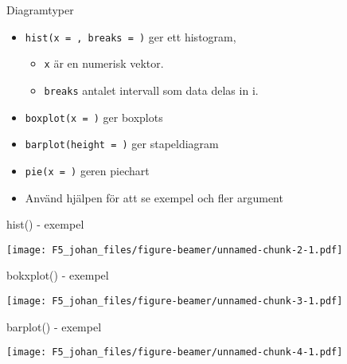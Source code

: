 \documentclass[
  11pt,
  ignorenonframetext,
  handout]{beamer}
\newenvironment{Shaded}{\begin{snugshade}}{\end{snugshade}}
\newcommand{\FunctionTok}[1]{\textcolor[rgb]{0.00,0.00,0.00}{#1}}
\newcommand{\NormalTok}[1]{#1}
\newcommand{\OtherTok}[1]{\textcolor[rgb]{0.56,0.35,0.01}{#1}}
\newcommand{\SpecialCharTok}[1]{\textcolor[rgb]{0.00,0.00,0.00}{#1}}
\providecommand{\tightlist}{%
  \setlength{\itemsep}{0pt}\setlength{\parskip}{0pt}}
\begin{document}
\begin{frame}{Diagramtyper}
\protect\hypertarget{diagramtyper}{}
\begin{itemize}
\tightlist
\item
  \texttt{hist(x = , breaks = )} ger ett histogram,

  \begin{itemize}
  \tightlist
  \item
    \texttt{x} är en numerisk vektor.
  \item
    \texttt{breaks} antalet intervall som data delas in i.
  \end{itemize}
\item
  \texttt{boxplot(x = )} ger boxplots
\item
  \texttt{barplot(height = )} ger stapeldiagram
\item
  \texttt{pie(x = )} geren piechart
\item
  Använd hjälpen för att se exempel och fler argument
\end{itemize}
\end{frame}

\begin{frame}[fragile]{hist() - exempel}
\protect\hypertarget{hist---exempel}{}
\begin{Shaded}
\end{Shaded}

\texttt{[image: F5\_johan\_files/figure-beamer/unnamed-chunk-2-1.pdf]}
\end{frame}

\begin{frame}[fragile]{bokxplot() - exempel}
\protect\hypertarget{bokxplot---exempel}{}
\begin{Shaded}
\end{Shaded}

\texttt{[image: F5\_johan\_files/figure-beamer/unnamed-chunk-3-1.pdf]}
\end{frame}

\begin{frame}[fragile]{barplot() - exempel}
\protect\hypertarget{barplot---exempel}{}
\begin{Shaded}
\end{Shaded}

\texttt{[image: F5\_johan\_files/figure-beamer/unnamed-chunk-4-1.pdf]}
\end{frame}
\end{document}
